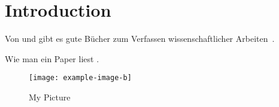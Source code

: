 \chapter{Introduction}
Von \textcite[deutsch]{Niederhauser2006} und
\textcite[englisch]{Gustavii2003} gibt es gute Bücher zum Verfassen
wissenschaftlicher Arbeiten~\cite{Gustavii2003}.

\lipsum*[1] Wie man ein Paper liest \cite{Keshav}.

\begin{figure}
\centering
  \texttt{[image: example-image-b]}
  \caption{My Picture}
\end{figure}
